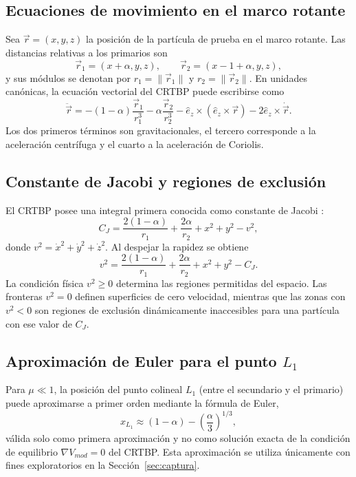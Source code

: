 \documentclass[12pt,a4paper]{article}
\begin{document}
\subsection{Ecuaciones de movimiento en el marco rotante}
Sea \(\vec r=(x,y,z)\) la posición de la partícula de prueba en el marco rotante. Las distancias relativas a los primarios son
\begin{equation}
\vec r_1=(x+\alpha,y,z),\qquad \vec r_2=(x-1+
\alpha,y,z),
\end{equation}
y sus módulos se denotan por \(r_1=\|\vec r_1\|\) y \(r_2=\|\vec r_2\|\). En unidades canónicas, la ecuación vectorial del CRTBP puede escribirse como
\begin{equation}
\ddot{\vec r}=-(1-\alpha)\frac{\vec r_1}{r_1^3}-\alpha\frac{\vec r_2}{r_2^3}
-\hat e_z\times(\hat e_z\times\vec r)-2\hat e_z\times\dot{\vec r}.
\end{equation}
Los dos primeros términos son gravitacionales, el tercero corresponde a la aceleración centrífuga y el cuarto a la aceleración de Coriolis.

\subsection{Constante de Jacobi y regiones de exclusión}
El CRTBP posee una integral primera conocida como constante de Jacobi \cite{szebehely1967,zuluaga_mecanica_celeste}:
\begin{equation}
C_J=\frac{2(1-\alpha)}{r_1}+\frac{2\alpha}{r_2}+x^2+y^2-v^2,
\end{equation}
donde \(v^2=\dot x^2+\dot y^2+\dot z^2\). Al despejar la rapidez se obtiene
\begin{equation}
v^2=\frac{2(1-\alpha)}{r_1}+\frac{2\alpha}{r_2}+x^2+y^2-C_J.
\end{equation}
La condición física \(v^2\geq0\) determina las regiones permitidas del espacio. Las fronteras \(v^2=0\) definen superficies de cero velocidad, mientras que las zonas con \(v^2<0\) son regiones de exclusión dinámicamente inaccesibles para una partícula con ese valor de \(C_J\).

\subsection{Aproximación de Euler para el punto \texorpdfstring{\(L_1\)}{L1}}
Para \(\mu\ll1\), la posición del punto colineal \(L_1\) (entre el secundario y el primario) puede aproximarse a primer orden mediante la fórmula de Euler,
\begin{equation}
x_{L_1}\approx (1-\alpha)-\left(\frac{\alpha}{3}\right)^{1/3},
\end{equation}
válida solo como primera aproximación y no como solución exacta de la condición de equilibrio \(\nabla V_{mod}=0\) del CRTBP. Esta aproximación se utiliza únicamente con fines exploratorios en la Sección~\ref{sec:captura}.
\end{document}
